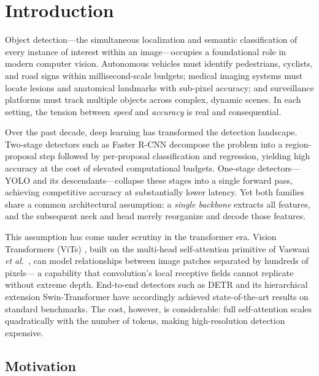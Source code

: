 
\section{Introduction}
\label{sec:intro}

Object detection—the simultaneous localization and semantic
classification of every instance of interest within an
image—occupies a foundational role in modern computer vision.
Autonomous vehicles must identify pedestrians, cyclists, and
road signs within millisecond-scale budgets; medical imaging
systems must locate lesions and anatomical landmarks with
sub-pixel accuracy; and surveillance platforms must track
multiple objects across complex, dynamic scenes. In each
setting, the tension between \textit{speed} and
\textit{accuracy} is real and consequential.

Over the past decade, deep learning has transformed the detection
landscape. Two-stage detectors such as Faster R-CNN
\cite{ren2015faster} decompose the problem into a region-proposal
step followed by per-proposal classification and regression, yielding
high accuracy at the cost of elevated computational budgets.
One-stage detectors---YOLO \cite{redmon2016yolo} and its
descendants---collapse these stages into a single forward pass,
achieving competitive accuracy at substantially lower latency.
Yet both families share a common architectural assumption: a
\textit{single backbone} extracts all features, and the subsequent
neck and head merely reorganize and decode those features.

This assumption has come under scrutiny in the transformer era.
Vision Transformers (ViTs) \cite{dosovitskiy2021vit}, built on
the multi-head self-attention primitive of Vaswani
\textit{et al.}\ \cite{vaswani2017attention}, can model
relationships between image patches separated by hundreds of pixels---
a capability that convolution's local receptive fields cannot
replicate without extreme depth. End-to-end detectors such as DETR
\cite{carion2020detr} and its hierarchical extension Swin-Transformer
\cite{liu2021swin} have accordingly achieved state-of-the-art results
on standard benchmarks. The cost, however, is considerable: full
self-attention scales quadratically with the number of tokens, making
high-resolution detection expensive.

\subsection{Motivation}
\label{sec:motivation}

